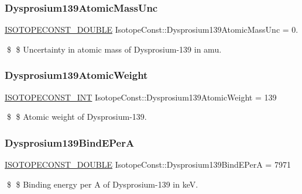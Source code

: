 \subsubsection{\texorpdfstring{Dysprosium139\+Atomic\+Mass\+Unc}{Dysprosium139AtomicMassUnc}}
{\footnotesize\ttfamily \mbox{\hyperlink{group___isotope_const-_macros_ga8f45a7272ce02c0b4c65c44636ed719a}{I\+S\+O\+T\+O\+P\+E\+C\+O\+N\+S\+T\+\_\+\+D\+O\+U\+B\+LE}} Isotope\+Const\+::\+Dysprosium139\+Atomic\+Mass\+Unc = 0.}

\$ \$ Uncertainty in atomic mass of Dysprosium-\/139 in amu. \mbox{\label{group___isotope_const-_dysprosium-_dy139_ga13f13988a5e451b81dd4e3ea46db246d}} 
\subsubsection{\texorpdfstring{Dysprosium139\+Atomic\+Weight}{Dysprosium139AtomicWeight}}
{\footnotesize\ttfamily \mbox{\hyperlink{group___isotope_const-_macros_ga5f18360b3e99483a35c32d789e62621c}{I\+S\+O\+T\+O\+P\+E\+C\+O\+N\+S\+T\+\_\+\+I\+NT}} Isotope\+Const\+::\+Dysprosium139\+Atomic\+Weight = 139}

\$ \$ Atomic weight of Dysprosium-\/139. \mbox{\label{group___isotope_const-_dysprosium-_dy139_ga32b94a375d2f2dcf0633ca8b632e0339}} 
\subsubsection{\texorpdfstring{Dysprosium139\+Bind\+E\+PerA}{Dysprosium139BindEPerA}}
{\footnotesize\ttfamily \mbox{\hyperlink{group___isotope_const-_macros_ga8f45a7272ce02c0b4c65c44636ed719a}{I\+S\+O\+T\+O\+P\+E\+C\+O\+N\+S\+T\+\_\+\+D\+O\+U\+B\+LE}} Isotope\+Const\+::\+Dysprosium139\+Bind\+E\+PerA = 7971}

\$ \$ Binding energy per A of Dysprosium-\/139 in keV. \mbox{\label{group___isotope_const-_dysprosium-_dy139_ga93c0d417dded512ddbbfe5bdae77abda}} 
